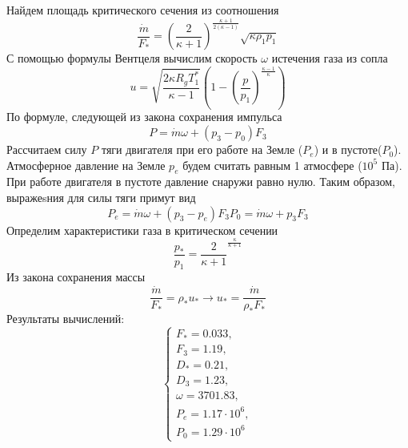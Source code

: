 \documentclass[12pt, a4paper]{article}
\begin{document}
Найдем площадь критического сечения из соотношения
\[
\frac{\dot{m}}{F_*} = \left(\frac{2}{\kappa + 1}\right)^{\frac{\kappa + 1}{2 \left(\kappa - 1\right)}} \sqrt{\kappa \rho_1 p_1}
\]
С помощью формулы Вентцеля вычислим скорость $\omega$ истечения газа из сопла
\[
u = \sqrt{\frac{2 \kappa R_g T_1^*}{\kappa - 1}} \left(1 - \left(\frac{p}{p_1}\right)^{\frac{\kappa - 1}{\kappa}} \right)
\]
По формуле, следующей из закона сохранения импульса
\[
P = \dot{m} \omega + \left(p_3 - p_0\right) F_3
\]
Рассчитаем силу $P$ тяги двигателя при его работе на Земле ($P_e$) и в пустоте($P_0$). Атмосферное давление на Земле $p_e$ будем считать равным 1 атмосфере ($10^5$ Па). При работе двигателя в пустоте давление снаружи равно нулю. Таким образом, выражеsния для силы тяги примут вид
\[
P_e = \dot{m} \omega + \left(p_3 - p_e\right) F_3
P_0 = \dot{m} \omega + p_3 F_3
\]
Определим характеристики газа в критическом сечении
\[
\frac{p_*}{p_1} = \frac{2}{\kappa + 1}^{\frac{\kappa}{\kappa + 1}}
\]
Из закона сохранения массы
\[
\frac{\dot{m}}{F_*} = \rho_* u_* \rightarrow u_* = \frac{\dot{m}}{\rho_* F_*}
\]
Результаты вычислений:
\[
\begin{cases}
	F_* = 0.033,\\
	F_3 = 1.19,\\
	D_* = 0.21,\\
	D_3 = 1.23,\\
	\omega = 3701.83,\\
	P_e = 1.17 \cdot 10^6,\\
	P_0 = 1.29 \cdot 10^6
\end{cases}
\]
\end{document}

